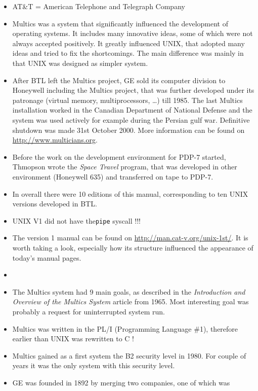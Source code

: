 \begin{itemize}
\item AT\&T = American Telephone and Telegraph Company
\item Multics was a system that significantly influenced the development of
operating systems. It includes many innovative ideas, some of which were not
always accepted positively. It greatly influenced UNIX, that adopted many ideas
and tried to fix the shortcomings. The main difference was mainly in that UNIX
was designed as simpler system.
\item After BTL left the Multics project, GE sold its computer division to
Honeywell including the Multics project, that was further developed under its
patronage (virtual memory, multiprocessors, \dots) till 1985.
The last Multics installation worked in the Canadian Department of National
Defense and the system was used actively for example during the Persian gulf
war. Definitive shutdown was made 31st October 2000. More information can be
found on \url{http://www.multicians.org}.
\item Before the work on the development environment for PDP-7 started, Thmopson
wrote the \emph{Space Travel} program, that was developed in other environment
(Honeywell 635) and transferred on tape to PDP-7.
\item In overall there were 10 editions of this manual, corresponding to ten
UNIX versions developed in BTL.
\item UNIX V1 did not have the\texttt{pipe} syscall !!!
\item The version 1 manual can be found on
\url{http://man.cat-v.org/unix-1st/}.
It is worth taking a look, especially how its structure influenced the
appearance of today's manual pages.
\item {}
\item The Multics system had 9 main goals, as described in the
\emph{Introduction and Overview of the Multics System} article from 1965.
Most interesting goal was probably a request for uninterrupted system run.
\item Multics was written in the PL/I (Programming Language \#1), therefore
earlier than UNIX was rewritten to C !
\item Multics gained as a first system the B2 security level in 1980.
For couple of years it was the only system with this security level.
\item GE was founded in 1892 by merging two companies, one of which was

\end{itemize}
